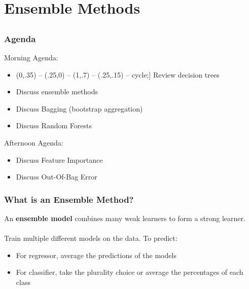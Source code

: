 \documentclass[table,dvipsnames]{beamer}
\def\checkmark{\tikz\fill[scale=0.4](0,.35) -- (.25,0) -- (1,.7) -- (.25,.15) -- cycle;}
\newcommand{\keywd}{\textcolor{myorange}}
\begin{document}
\section{Ensemble Methods}
\subsection{}

\begin{frame}
\frametitle{Agenda}
\scriptsize
Morning Agenda:

\begin{block}{}
\begin{itemize}
    \item[\checkmark] Review decision trees
    \item Discuss ensemble methods
    \item Discuss \keywd{Bagging} (bootstrap aggregation)
    \item Discuss \keywd{Random Forests}
\end{itemize}
\end{block}

Afternoon Agenda:

\begin{block}{}
\begin{itemize}
    \item Discuss \keywd{Feature Importance}
    \item Discuss \keywd{Out-Of-Bag Error}
\end{itemize}
\end{block}
\end{frame}


\begin{frame}
\frametitle{What is an Ensemble Method?}
An \textbf{ensemble model} combines many weak learners to form a strong learner.
\ \\
\ \\
Train multiple different models on the data. To predict:
\begin{itemize}
    \item For regressor, average the predictions of the models
    \item For classifier, take the plurality choice or average the percentages of each class
\end{itemize}
\end{frame}
\end{document}
